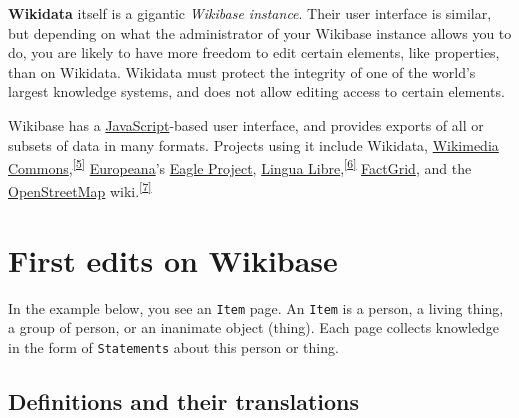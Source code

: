 \documentclass[
  letterpaper,
  DIV=11,
  numbers=noendperiod]{scrreprt}
\begin{document}
\begin{tcolorbox}[enhanced jigsaw, opacityback=0, bottomrule=.15mm, rightrule=.15mm, toptitle=1mm, breakable, colbacktitle=quarto-callout-note-color!10!white, colback=white, title=\textcolor{quarto-callout-note-color}{\faInfo}\hspace{0.5em}{Note}, leftrule=.75mm, toprule=.15mm, left=2mm, arc=.35mm, colframe=quarto-callout-note-color-frame, coltitle=black, titlerule=0mm, bottomtitle=1mm, opacitybacktitle=0.6]

\textbf{Wikidata} itself is a gigantic \emph{Wikibase instance}. Their
user interface is similar, but depending on what the administrator of
your Wikibase instance allows you to do, you are likely to have more
freedom to edit certain elements, like properties, than on Wikidata.
Wikidata must protect the integrity of one of the world's largest
knowledge systems, and does not allow editing access to certain
elements.

\end{tcolorbox}

Wikibase has a
\href{https://en.wikipedia.org/wiki/JavaScript}{JavaScript}-based user
interface, and provides exports of all or subsets of data in many
formats. Projects using it include Wikidata,
\href{https://en.wikipedia.org/wiki/Wikimedia_Commons}{Wikimedia
Commons},\textsuperscript{\href{https://en.wikipedia.org/wiki/Wikibase\#cite_note-5}{{[}5{]}}}
\href{https://en.wikipedia.org/wiki/Europeana}{Europeana}'s
\href{https://wiki.eagle-network.eu/wiki/Main_Page}{Eagle Project},
\href{https://en.wikipedia.org/wiki/Lingua_Libre}{Lingua
Libre},\textsuperscript{\href{https://en.wikipedia.org/wiki/Wikibase\#cite_note-6}{{[}6{]}}}
\href{https://en.wikipedia.org/wiki/FactGrid}{FactGrid}, and the
\href{https://en.wikipedia.org/wiki/OpenStreetMap}{OpenStreetMap}
wiki.\textsuperscript{\href{https://en.wikipedia.org/wiki/Wikibase\#cite_note-7}{{[}7{]}}}

\section{First edits on Wikibase}\label{sec-first-edits-wikibase}

In the example below, you see an \texttt{Item} page. An \texttt{Item} is
a person, a living thing, a group of person, or an inanimate object
(thing). Each page collects knowledge in the form of \texttt{Statements}
about this person or thing.

\subsection{Definitions and their
translations}\label{definitions-and-their-translations-1}
\end{document}
